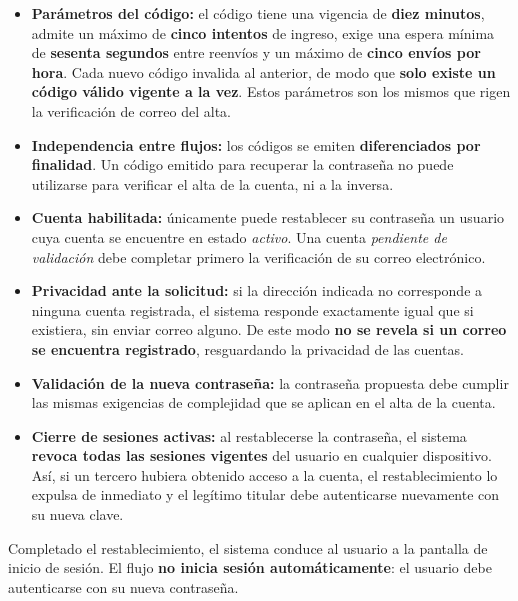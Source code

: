 \documentclass[a4paper,12pt]{article}
\begin{document}
    \begin{itemize}
        \item \textbf{Parámetros del código:} el código tiene una vigencia de \textbf{diez minutos}, admite un máximo de \textbf{cinco intentos} de ingreso, exige una espera mínima de \textbf{sesenta segundos} entre reenvíos y un máximo de \textbf{cinco envíos por hora}. Cada nuevo código invalida al anterior, de modo que \textbf{solo existe un código válido vigente a la vez}. Estos parámetros son los mismos que rigen la verificación de correo del alta.
        \item \textbf{Independencia entre flujos:} los códigos se emiten \textbf{diferenciados por finalidad}. Un código emitido para recuperar la contraseña no puede utilizarse para verificar el alta de la cuenta, ni a la inversa.
        \item \textbf{Cuenta habilitada:} únicamente puede restablecer su contraseña un usuario cuya cuenta se encuentre en estado \textit{activo}. Una cuenta \textit{pendiente de validación} debe completar primero la verificación de su correo electrónico.
        \item \textbf{Privacidad ante la solicitud:} si la dirección indicada no corresponde a ninguna cuenta registrada, el sistema responde exactamente igual que si existiera, sin enviar correo alguno. De este modo \textbf{no se revela si un correo se encuentra registrado}, resguardando la privacidad de las cuentas.
        \item \textbf{Validación de la nueva contraseña:} la contraseña propuesta debe cumplir las mismas exigencias de complejidad que se aplican en el alta de la cuenta.
        \item \textbf{Cierre de sesiones activas:} al restablecerse la contraseña, el sistema \textbf{revoca todas las sesiones vigentes} del usuario en cualquier dispositivo. Así, si un tercero hubiera obtenido acceso a la cuenta, el restablecimiento lo expulsa de inmediato y el legítimo titular debe autenticarse nuevamente con su nueva clave.
    \end{itemize}
    \par Completado el restablecimiento, el sistema conduce al usuario a la pantalla de inicio de sesión. El flujo \textbf{no inicia sesión automáticamente}: el usuario debe autenticarse con su nueva contraseña.
\end{document}
